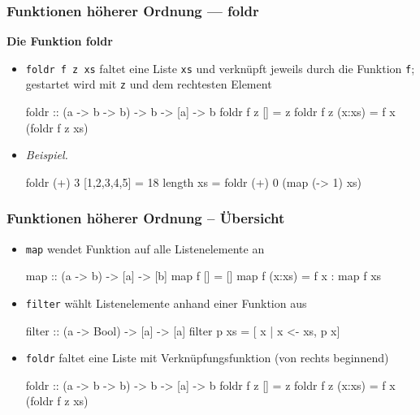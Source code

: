 \documentclass{beamer}
\begin{document}
\begin{frame}[fragile] \frametitle{Funktionen höherer Ordnung --- foldr}
	\footnotesize
	\textbf{Die Funktion foldr}
	\begin{itemize}
		\item \texttt{foldr f z xs} faltet eine Liste \texttt{xs} und verknüpft jeweils durch die Funktion \texttt{f}; gestartet wird mit \texttt{z} und dem rechtesten Element \\[6pt]
		\begin{codebox}
foldr :: (a -> b -> b) -> b -> [a] -> b
foldr f z []     = z 
foldr f z (x:xs) = f x (foldr f z xs) 
		\end{codebox}
		\item \emph{Beispiel.} \\[6pt]
		\begin{codebox}
foldr (+) 3 [1,2,3,4,5] = 18
length xs = foldr (+) 0 (map (\x -> 1) xs)
		\end{codebox}
	\end{itemize}
\end{frame}


\begin{frame}[fragile] \frametitle{Funktionen höherer Ordnung -- Übersicht}
	\footnotesize
	\begin{itemize}
		\item \texttt{map} wendet Funktion auf alle Listenelemente an \\[6pt]
		\begin{codebox}
map :: (a -> b) -> [a] -> [b]
map f [] = []
map f (x:xs) = f x : map f xs
		\end{codebox}
		\item \texttt{filter} wählt Listenelemente anhand einer Funktion aus \\[6pt]
		\begin{codebox}
filter :: (a -> Bool) -> [a] -> [a]
filter p xs = [ x | x <- xs, p x]
		\end{codebox}
		\item \texttt{foldr} faltet eine Liste mit Verknüpfungsfunktion (von rechts beginnend) \\[6pt]
		\begin{codebox}
foldr :: (a -> b -> b) -> b -> [a] -> b
foldr f z []     = z
foldr f z (x:xs) = f x (foldr f z xs) 
		\end{codebox}
	\end{itemize}
\end{frame}
\end{document}
